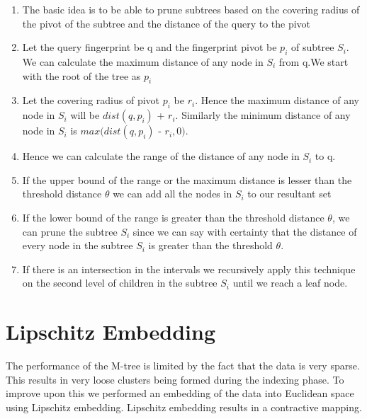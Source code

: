 \begin{enumerate}
	\item The basic idea is to be able to prune subtrees based on the covering radius of the pivot of the subtree and the distance of the query to the pivot
	 
	\item Let the query fingerprint be q and the fingerprint pivot be $p_i$ of subtree $S_i$. We can calculate the maximum distance of any node in $S_i$ from q.We start with the root of the tree as $p_i$
	
	\item Let the covering radius of pivot $p_i$ be $r_i$. Hence the maximum distance of any node in $S_i$ will be $dist(q,p_i)$ + $r_i$. Similarly the minimum distance of any node in $S_i$ is $max(dist(q,p_i)$ - $r_i, 0)$. 
	
	\item Hence we can calculate the range of the distance of any node in $S_i$ to q. 
	
	\item  If the upper bound of the range or the maximum distance is lesser than the threshold distance $\theta$ we can add all the nodes in $S_i$ to our resultant set
	
	\item If the lower bound of the range is greater than the threshold distance $\theta$, we can prune the subtree $S_i$ since we can say with certainty that the distance of every node in the subtree $S_i$ is greater than  the threshold $\theta$.
	
	\item If there is an intersection in the intervals we recursively apply this technique on the second level of children in the subtree $S_i$ until we reach a leaf node.
	
\end{enumerate}



\section{Lipschitz Embedding}

The performance of the M-tree is limited by the fact that the data is very sparse. This results in very loose clusters being formed during the indexing phase. To improve upon this we performed an embedding of the data into Euclidean space using Lipschitz embedding. Lipschitz embedding results in a contractive mapping.\\

